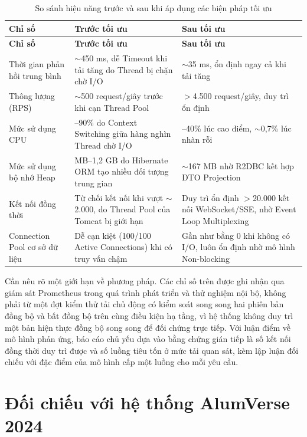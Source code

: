 \documentclass[12pt,a4paper,oneside]{report}
\begin{document}
\renewcommand{\arraystretch}{1.2}
\begin{longtable}{|>{\raggedright\arraybackslash}p{3.4cm}|>{\raggedright\arraybackslash}p{4.6cm}|>{\raggedright\arraybackslash}p{4.6cm}|}
\caption{So sánh hiệu năng trước và sau khi áp dụng các biện pháp tối ưu}\label{tab:beforeafter}\\
\hline \textbf{Chỉ số} & \textbf{Trước tối ưu} & \textbf{Sau tối ưu} \\ \hline
\endfirsthead
\hline \textbf{Chỉ số} & \textbf{Trước tối ưu} & \textbf{Sau tối ưu} \\ \hline
\endhead
Thời gian phản hồi trung bình & $\sim$450 ms, dễ Timeout khi tải tăng do Thread bị chặn chờ I/O & $\sim$35 ms, ổn định ngay cả khi tải tăng \\ \hline
Thông lượng (RPS) & $\sim$500 request/giây trước khi cạn Thread Pool & $>$4.500 request/giây, duy trì ổn định \\ \hline
Mức sử dụng CPU & 85--90\% do Context Switching giữa hàng nghìn Thread chờ I/O & 35--40\% lúc cao điểm, $\sim$0,7\% lúc nhàn rỗi \\ \hline
Mức sử dụng bộ nhớ Heap & 800 MB--1,2 GB do Hibernate ORM tạo nhiều đối tượng trung gian & $\sim$167 MB nhờ R2DBC kết hợp DTO Projection \\ \hline
Kết nối đồng thời & Từ chối kết nối khi vượt $\sim$2.000, do Thread Pool của Tomcat bị giới hạn & Duy trì ổn định $>$20.000 kết nối WebSocket/SSE, nhờ Event Loop Multiplexing \\ \hline
Connection Pool cơ sở dữ liệu & Dễ cạn kiệt (100/100 Active Connections) khi có truy vấn chậm & Gần như bằng 0 khi không có I/O, luôn ổn định nhờ mô hình Non-blocking \\ \hline
\end{longtable}
\renewcommand{\arraystretch}{1}

Cần nêu rõ một giới hạn về phương pháp. Các chỉ số trên được ghi nhận qua giám sát Prometheus trong quá trình phát triển và thử nghiệm nội bộ, không phải từ một đợt kiểm thử tải chủ động có kiểm soát song song hai phiên bản đồng bộ và bất đồng bộ trên cùng điều kiện hạ tầng, vì hệ thống không duy trì một bản hiện thực đồng bộ song song để đối chứng trực tiếp. Với luận điểm về mô hình phản ứng, báo cáo chủ yếu dựa vào bằng chứng gián tiếp là số kết nối đồng thời duy trì được và số luồng tiêu tốn ở mức tải quan sát, kèm lập luận đối chiếu với đặc điểm của mô hình cấp một luồng cho mỗi yêu cầu.

\section{Đối chiếu với hệ thống AlumVerse 2024}
\end{document}
